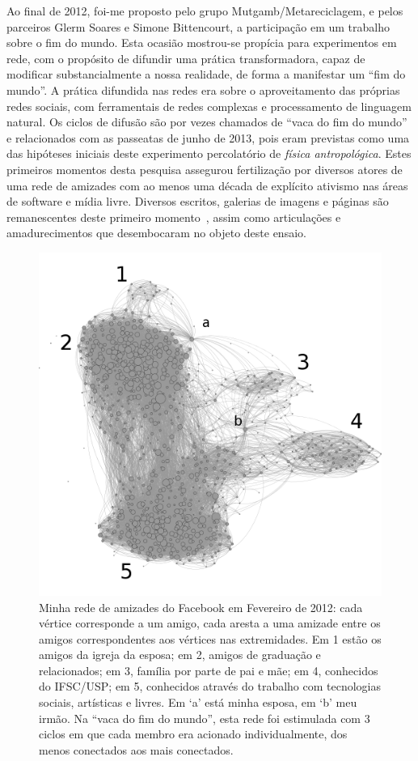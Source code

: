 \documentclass[a4paper, 11pt]{article} %
\begin{document}
Ao final de 2012, foi-me proposto pelo grupo Mutgamb/Metareciclagem, e pelos parceiros Glerm Soares e Simone Bittencourt, a participação  em um trabalho sobre o fim do mundo. Esta ocasião mostrou-se propícia para experimentos em rede, com o propósito de difundir uma prática transformadora, capaz de modificar substancialmente a nossa realidade, de forma a manifestar um ``fim do mundo''. A prática difundida nas redes era sobre o aproveitamento das próprias redes sociais, com ferramentais de redes complexas e processamento de linguagem natural. Os ciclos de difusão são por vezes chamados de ``vaca do fim do mundo'' e relacionados com as passeatas de junho de 2013, pois eram previstas como uma das hipóteses iniciais deste experimento percolatório de \emph{física antropológica}. Estes primeiros momentos desta pesquisa assegurou fertilização por diversos atores de uma rede de amizades com ao menos uma década de explícito ativismo nas áreas de software e mídia livre. Diversos escritos, galerias de imagens e páginas são remanescentes deste primeiro momento~\cite{ciberiun,ars,rc1,rc2}, assim como articulações e amadurecimentos que desembocaram no objeto deste ensaio.
\begin{figure}[h!]
  \centering
    \includegraphics[width=.9\textwidth]{rederf.png}
  \caption{\small Minha rede de amizades do Facebook em Fevereiro de 2012: cada vértice corresponde a um amigo, cada aresta a uma amizade entre os amigos correspondentes aos vértices nas extremidades. Em 1 estão os amigos da igreja da esposa; em 2, amigos de graduação e relacionados; em 3, família por parte de pai e mãe; em 4, conhecidos do IFSC/USP; em 5, conhecidos através do trabalho com tecnologias sociais, artísticas e livres. Em `a' está minha esposa, em `b' meu irmão. Na ``vaca do fim do mundo'', esta rede foi estimulada com 3 ciclos em que cada membro era acionado individualmente, dos menos conectados aos mais conectados.}\label{fig:redem}
\end{figure}
\end{document}
